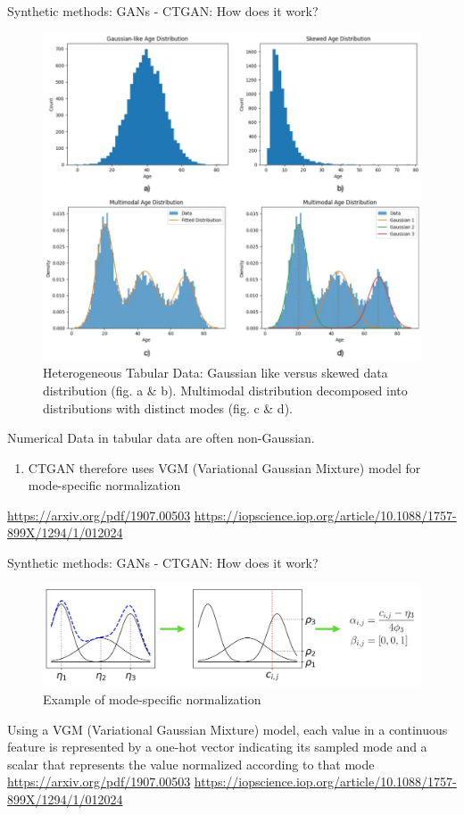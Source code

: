 \documentclass[
	aspectratio = 169
 ]{beamer}
\begin{document}
\begin{frame}{Synthetic methods: GANs - CTGAN: How does it work?}
  
  \begin{figure}
      \centering
      \includegraphics[width=0.3\linewidth]{Presentation TEX/gallery/gaussian-nongaussian.png}
  \caption{Heterogeneous Tabular Data: Gaussian like versus skewed data distribution (fig. a \& b). Multimodal distribution decomposed into distributions with distinct modes (fig. c \& d).}
  \end{figure}
Numerical Data in tabular data are often non-Gaussian.
\begin{enumerate}
    \item CTGAN therefore uses VGM (Variational Gaussian Mixture) model for mode-specific normalization
\end{enumerate}
\tiny{\url{https://arxiv.org/pdf/1907.00503}}
\newline
\tiny{\url{https://iopscience.iop.org/article/10.1088/1757-899X/1294/1/012024}}

\end{frame}
\begin{frame}{Synthetic methods: GANs - CTGAN: How does it work?}
 
  \begin{figure}
      \centering
      \includegraphics[width=0.5\linewidth]{Presentation TEX/gallery/mode-specific-normalization.png}
  \caption{Example of mode-specific normalization}
  \end{figure}
Using a VGM (Variational
Gaussian Mixture) model, each value in a continuous feature is represented by a one-hot vector
indicating its sampled mode and a scalar that represents the value normalized according to that mode
\vspace{2.5mm}
\newline
\tiny{\url{https://arxiv.org/pdf/1907.00503}}
\newline
\tiny{\url{https://iopscience.iop.org/article/10.1088/1757-899X/1294/1/012024}}

\end{frame}
\end{document}
